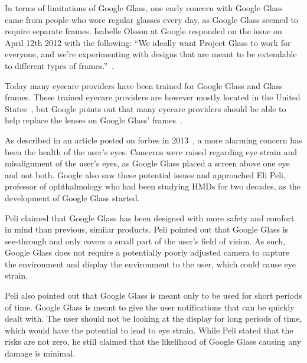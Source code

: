 In terms of limitations of Google Glass, one early concern with Google Glass came from people who wore regular glasses every day, as Google Glass seemed to require separate frames. Isabelle Olsson at Google responded on the issue on April 12th 2012 with the following: ``We ideally want Project Glass to work for everyone, and we're experimenting with designs that are meant to be extendable to different types of frames.''~\cite{GoogleGlassFrameResponse}.

Today many eyecare providers have been trained for Google Glass and Glass frames. These trained eyecare providers are however mostly located in the United States~\cite{frameProviders}, but Google points out that many eyecare providers should be able to help replace the lenses on Google Glass' frames~\cite{framesGlass}.

As described in an article posted on forbes in 2013~\cite{ackerman13}, a more alarming concern has been the health of the user's eyes. Concerns were raised regarding eye strain and misalignment of the user's eyes, as Google Glass placed a screen above one eye and not both. Google also saw these potential issues and approached Eli Peli, professor of ophthalmology who had been studying HMDs for two decades, as the development of Google Glass started.

Peli claimed that Google Glass has been designed with more safety and comfort in mind than previous, similar products. Peli pointed out that Google Glass is see-through and only covers a small part of the user's field of vision. As such, Google Glass does not require a potentially poorly adjusted camera to capture the environment and display the environment to the user, which could cause eye strain.

Peli also pointed out that Google Glass is meant only to be used for short periods of time. Google Glass is meant to give the user notifications that can be quickly dealt with. The user should not be looking at the display for long periods of time, which would have the potential to lead to eye strain. While Peli stated that the risks are not zero, he still claimed that the likelihood of Google Glass causing any damage is minimal.

